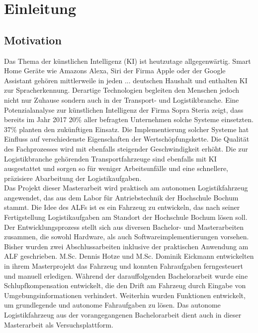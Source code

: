 
\chapter{Einleitung}
\label{ch: Einleitung}
	
	\section{Motivation}
	\label{sec: Motivation}
		Das Thema der künstlichen Intelligenz (KI) ist heutzutage allgegenwärtig. Smart Home Geräte wie Amazons Alexa, Siri der Firma Apple oder der Google Assistant gehören mittlerweile in jeden ... deutschen Haushalt und enthalten KI zur Spracherkennung. Derartige Technologien begleiten den Menschen jedoch nicht nur Zuhause sondern auch in der Transport- und Logistikbranche. Eine Potenzialanalyse zur künstlichen Intelligenz der Firma Sopra Steria zeigt, dass bereits im Jahr 2017 20\% aller befragten Unternehmen solche Systeme einsetzten. 37\% planten den zukünftigen Einsatz. Die Implementierung solcher Systeme hat Einfluss auf verschiedenste Eigenschaften der Wertschöpfungskette. Die Qualität des Fachprozesses wird mit ebenfalls steigender Geschwindigkeit erhöht. Die zur Logistikbranche gehörenden Transportfahrzeuge sind ebenfalls mit KI ausgestattet und sorgen so für weniger Arbeitsunfälle und eine schnellere, präzisiere Abarbeitung der Logistikaufgaben.\\
		
		
		Das Projekt dieser Masterarbeit wird praktisch am autonomen Logistikfahrzeug angewendet, das aus dem Labor für Antriebstechnik der Hochschule Bochum stammt. Die Idee des ALFs ist es ein Fahrzeug zu entwickeln, das nach seiner Fertigstellung Logistikaufgaben am Standort der Hochschule Bochum lösen soll. Der Entwicklungsprozess stellt sich aus diversen Bachelor- und Masterarbeiten zusammen, die sowohl Hardware, als auch Softwareimplementierungen vorsehen. Bisher wurden zwei Abschlussarbeiten inklusive der praktischen Anwendung am ALF geschrieben. M.Sc. Dennis Hotze und M.Sc. Dominik Eickmann entwickelten in ihrem Masterprojekt das Fahrzeug und konnten Fahraufgaben ferngesteuert und manuell erledigen. Während der darauffolgenden Bachelorarbeit wurde eine Schlupfkompensation entwickelt, die den Drift am Fahrzeug durch Eingabe von Umgebungsinformationen verhindert. Weiterhin wurden Funktionen entwickelt, um grundlegende und autonome Fahraufgaben zu lösen. Das autonome Logistikfahrzeug aus der vorangegangenen Bachelorarbeit dient auch in dieser Masterarbeit als Versuchsplattform. 
	
